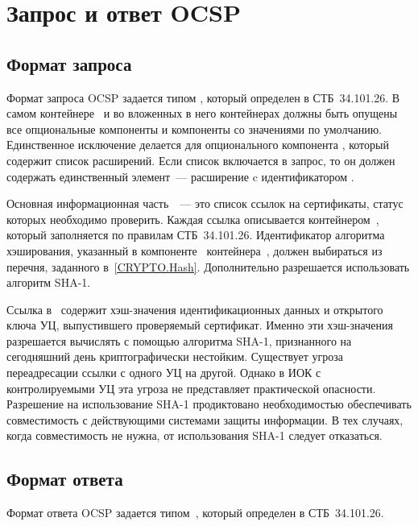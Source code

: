 \section{Запрос и ответ OCSP}\label{FMT.OCSP}

\subsection{Формат запроса}

Формат запроса OCSP задается типом , который определен 
в СТБ~34.101.26. В самом контейнере~ и во вложенных в него
контейнерах должны быть опущены все опциональные компоненты и компоненты 
со значениями по умолчанию. Единственное исключение делается 
для опционального компонента , который содержит список  
расширений. Если список включается в запрос, то он должен содержать единственный 
элемент~--- расширение c идентификатором .

Основная информационная часть~~--- это список ссылок
на сертификаты, статус которых необходимо проверить.
%
Каждая ссылка описывается контейнером~, который заполняется по
правилам СТБ~34.101.26. Идентификатор алгоритма хэширования, указанный в
компоненте~ контейнера~, должен выбираться из
перечня, заданного в~\ref{CRYPTO.Hash}. Дополнительно разрешается
использовать алгоритм SHA-1.

\begin{note*}
Ссылка в~ содержит хэш-значения идентификационных данных и 
открытого ключа УЦ, выпустившего проверяемый сертификат. Именно эти 
хэш-значения разрешается вычислять с помощью алгоритма SHA-1, признанного на 
сегодняшний день криптографически нестойким. Существует угроза переадресации 
ссылки с одного УЦ на другой. Однако в ИОК с контролируемыми УЦ эта угроза не 
представляет практической опасности.
%
Разрешение на использование SHA-1 продиктовано необходимостью обеспечивать 
совместимость с действующими системами защиты информации. В тех случаях, когда 
совместимость не нужна, от использования SHA-1 следует отказаться.
\end{note*}

\subsection{Формат ответа}

Формат ответа OCSP задается типом~, который определен 
в СТБ~34.101.26. 

